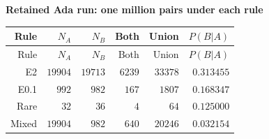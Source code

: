 
\begingroup\small
\setlength{\tabcolsep}{4pt}
\noindent\textbf{Retained Ada run: one million pairs under each rule}
\begin{longtable}{rrrrrr}
\toprule
Rule & $N_A$ & $N_B$ & Both & Union & $P(B|A)$ \\
\midrule
\endfirsthead
Rule & $N_A$ & $N_B$ & Both & Union & $P(B|A)$ \\
\midrule
\endhead
\bottomrule
\endfoot
E2 & $19904$ & $19713$ & $6239$ & $33378$ & $0.313455$ \\
E0.1 & $992$ & $982$ & $167$ & $1807$ & $0.168347$ \\
Rare & $32$ & $36$ & $4$ & $64$ & $0.125000$ \\
Mixed & $19904$ & $982$ & $640$ & $20246$ & $0.032154$ \\
\end{longtable}
\endgroup

